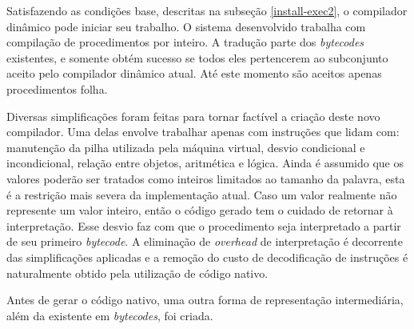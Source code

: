 

Satisfazendo as condições base, descritas na subseção
\ref{install-exec2}, o compilador dinâmico pode iniciar seu trabalho.
O sistema desenvolvido trabalha com compilação de procedimentos por
inteiro. A tradução parte dos \textit{bytecodes} existentes,
e somente obtém sucesso se todos eles pertencerem ao subconjunto
aceito pelo compilador
dinâmico atual. Até este momento são aceitos apenas procedimentos folha.


Diversas simplificações foram feitas para tornar factível a criação
deste novo compilador. Uma delas envolve trabalhar apenas com
instruções que lidam com: manutenção da pilha utilizada pela máquina
virtual, desvio condicional e incondicional, relação entre objetos, aritmética e
lógica. Ainda é assumido que os valores poderão ser tratados como
inteiros limitados ao tamanho da palavra, esta é a restrição mais severa da
implementação atual. Caso um valor realmente não represente um valor
inteiro, então o código gerado tem o cuidado de retornar à
interpretação. Esse desvio faz com que o procedimento seja
interpretado a partir de seu primeiro \textit{bytecode}.
A eliminação de \textit{overhead} de interpretação é decorrente das
simplificações aplicadas e a remoção do custo de decodificação de
instruções é naturalmente obtido pela utilização de código nativo.


Antes de gerar o código nativo, uma outra forma de representação
intermediária, além da existente em \textit{bytecodes}, foi criada.



